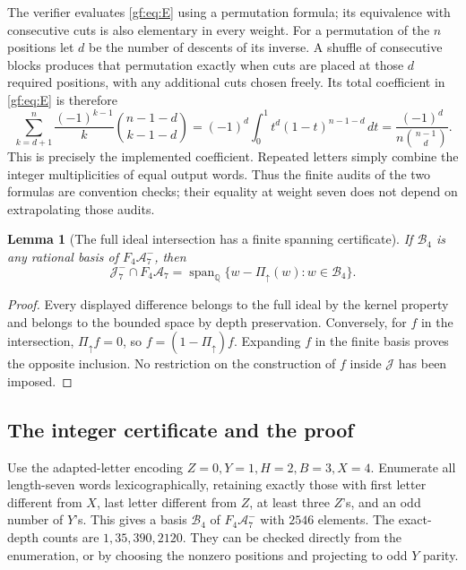 \documentclass[11pt,a4paper]{article}
\numberwithin{equation}{section}
\newtheorem{lemma}[theorem]{Lemma}
\theoremstyle{definition}
\theoremstyle{remark}
\begin{document}
The verifier evaluates \eqref{gf:eq:E} using a permutation formula; its
equivalence with consecutive cuts is also elementary in every weight.
For a permutation of the $n$ positions let $d$ be the number of descents
of its inverse. A shuffle of consecutive blocks produces that permutation
exactly when cuts are placed at those $d$ required positions, with any
additional cuts chosen freely. Its total coefficient in \eqref{gf:eq:E}
is therefore
\[
 \sum_{k=d+1}^n\frac{(-1)^{k-1}}k
      \binom{n-1-d}{k-1-d}
   =(-1)^d\int_0^1 t^d(1-t)^{n-1-d}\,dt
   =\frac{(-1)^d}{n\binom{n-1}{d}}.
\]
This is precisely the implemented coefficient. Repeated letters simply
combine the integer multiplicities of equal output words. Thus the
finite audits of the two formulas are convention checks; their equality
at weight seven does not depend on extrapolating those audits.

\begin{lemma}[The full ideal intersection has a finite spanning certificate]
\label{gf:lem:intersection}
If $\mathcal B_4$ is any rational basis of $F_4\mathcal A_7^-$, then
\[
 \mathcal J_7^-\cap F_4\mathcal A_7
   =\operatorname{span}_{\mathbb Q}
       \{w-\Pi_{\uparrow}(w):w\in\mathcal B_4\}.
\]
\end{lemma}
\begin{proof}
Every displayed difference belongs to the full ideal by the kernel
property and belongs to the bounded space by depth preservation.
Conversely, for $f$ in the intersection, $\Pi_{\uparrow}f=0$, so
$f=(1-\Pi_{\uparrow})f$. Expanding $f$ in the finite basis proves the
opposite inclusion. No restriction on the construction of $f$ inside
$\mathcal J$ has been imposed.
\end{proof}

\subsection{The integer certificate and the proof}

Use the adapted-letter encoding $Z=0,Y=1,H=2,B=3,X=4$. Enumerate all
length-seven words lexicographically, retaining exactly those with first
letter different from $X$, last letter different from $Z$, at least three
$Z$'s, and an odd number of $Y$'s. This gives a basis $\mathcal B_4$ of
$F_4\mathcal A_7^-$ with $2546$ elements. The exact-depth counts are
$1,35,390,2120$. They can be checked directly from the enumeration, or
by choosing the nonzero positions and projecting to odd $Y$ parity.
\end{document}
